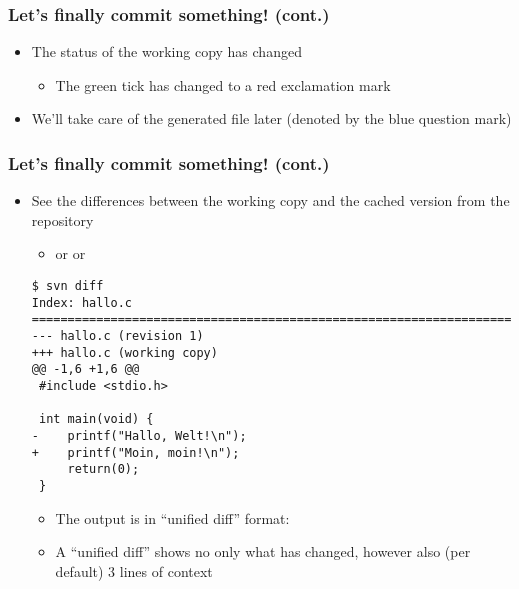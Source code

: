 \begin{frame}
    \frametitle{Let's finally commit something! (cont.)}
    \begin{itemize}
        \item The status of the working copy has changed
            \begin{itemize}
                \item The green tick has changed to a red exclamation mark
            \end{itemize}
        \item We'll take care of the generated  file later
            (denoted by the blue question mark)
    \end{itemize}
    \centering{
    }
\end{frame}

\begin{frame}[fragile]
    \linuxframe
    \frametitle{Let's finally commit something! (cont.)}
    \begin{itemize}
        \item See the differences between the working copy and the cached
            version from the repository
            \begin{itemize}
                \item {} or  or
            \end{itemize}
\begin{lstlisting}[basicstyle=\tiny\ttfamily\color{black}]
$ svn diff
Index: hallo.c
===================================================================
--- hallo.c (revision 1)
+++ hallo.c (working copy)
@@ -1,6 +1,6 @@
 #include <stdio.h>
 
 int main(void) {
-    printf("Hallo, Welt!\n");
+    printf("Moin, moin!\n");
     return(0);
 }
\end{lstlisting}
    \begin{itemize}
    \item The output is in \enquote{unified diff} format: 
    \item A \enquote{unified diff} shows no only what has changed, however
        also (per default) 3 lines of context
    \end{itemize}
\end{itemize}
\end{frame}

